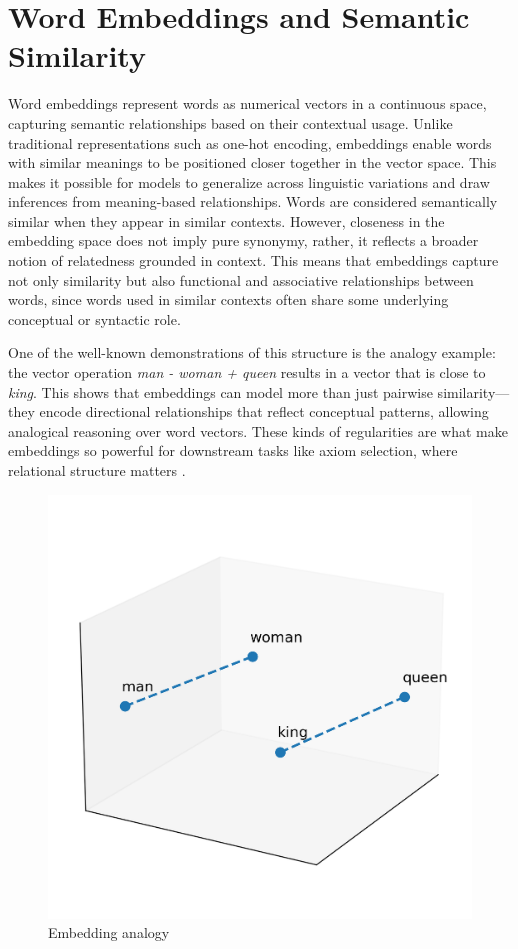 \documentclass[english,version-2020-11]{uzl-thesis}
\begin{document}
\section{Word Embeddings and Semantic Similarity}

Word embeddings represent words as numerical vectors in a continuous space, capturing semantic relationships based on their contextual usage. Unlike traditional representations such as one-hot encoding, embeddings enable words with similar meanings to be positioned closer together in the vector space. This makes it possible for models to generalize across linguistic variations and draw inferences from meaning-based relationships.
Words are considered semantically similar when they appear in similar contexts. However, closeness in the embedding space does not imply pure synonymy, rather, it reflects a broader notion of relatedness grounded in context. This means that embeddings capture not only similarity but also functional and associative relationships between words, since words used in similar contexts often share some underlying conceptual or syntactic role.

One of the well-known demonstrations of this structure is the analogy example: the vector operation \textit{man - woman + queen} results in a vector that is close to \textit{king}. This shows that embeddings can model more than just pairwise similarity—they encode directional relationships that reflect conceptual patterns, allowing analogical reasoning over word vectors. These kinds of regularities are what make embeddings so powerful for downstream tasks like axiom selection, where relational structure matters \cite{Mikolov2013}.

\begin{figure}[h!]
    \centering
    \includegraphics[width=\textwidth]{embedding_analogy.png}
    \caption{Embedding analogy}
    \label{fig:embedding_analogy}
\end{figure}
\FloatBarrier
\end{document}
